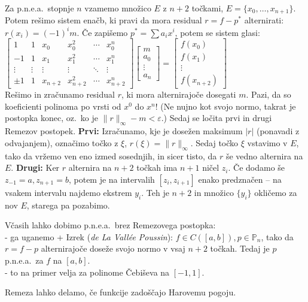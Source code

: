 \documentclass[a4paper,12pt]{article}
\theoremstyle{definition}
\def\P{\mathbb{P}}
\newcommand{\eps}{\varepsilon}
\begin{document}
Za p.n.e.a.\ stopnje $n$ vzamemo množico $E$ z $n+2$ točkami, $E = \{x_0, \ldots, x_{n+1}\}$.
Potem rešimo sistem enačb, ki pravi da mora residual $r = f - p^\ast$ alternirati: $r(x_i) = (-1)^i m$.
Če zapišemo $p^* = \sum a_i x^i$, potem se sistem glasi:\\
$\begin{bmatrix}
  1 & 1 & x_0 & x_0^2 & \cdots & x_0^n \\
  -1 & 1 & x_1 & x_1^2 & \cdots & x_1^n \\
  \vdots & \vdots & \vdots & \vdots & \ddots & \vdots \\
  \pm 1 & 1 & x_{n+2} & x_{n+2}^2 & \cdots & x_{n+2}^n
\end{bmatrix}
\begin{bmatrix}
  m \\ a_0 \\  \vdots \\ a_n
\end{bmatrix}
=
\begin{bmatrix}
  f(x_0) \\ f(x_1) \\ \vdots \\ f(x_{n+2})
\end{bmatrix}
$ \\
Rešimo in zračunamo residual $r$, ki mora alternirajoče dosegati $m$. Pazi, da so koeficienti polinoma
po vrsti od $x^0$ do $x^n$!
(Ne nujno kot svojo normo, takrat je postopka konec, oz.~ko je $\|r\|_\infty - m < \eps$.)
Sedaj se ločita prvi in drugi Remezov postopek.
\textbf{Prvi:}
Izračunamo, kje je dosežen maksimum $|r|$ (ponavadi z odvajanjem),
označimo točko z $\xi$, $r(\xi) = \|r\|_\infty$. Sedaj točko $\xi$ vstavimo v $E$, tako da vržemo ven
eno izmed sosednjih, in sicer tisto, da $r$ še vedno alternira na $E$.
\textbf{Drugi:}
Ker $r$ alternira na $n+2$ točkah ima $n+1$ ničel $z_i$. Če dodamo še $z_{-1} = a, z_{n+1} = b$, potem
je na intervalih $[z_i, z_{i+1}]$ enako predznačen -- na vsakem intervalu najdemo ekstrem $y_i$. Teh je $n+2$ in
množico $\{y_i\}$ okličemo za nov $E$, starega pa pozabimo.

Včasih lahko dobimo p.n.e.a.\ brez Remezovega postopka:\\
- ga uganemo + Izrek (\emph{de La Vallée Poussin}): $f \in C([a,b]), p \in \P_n$, tako da $r = f-p$
alternirajoče doseže svojo normo v vsaj $n+2$ točkah. Tedaj je $p$ p.n.e.a.\ za $f$ na $[a,b]$.\\
- to na primer velja za polinome Čebiševa na $[-1, 1]$.

Remeza lahko delamo, če funkcije zadoščajo Harovemu pogoju.
\end{document}
